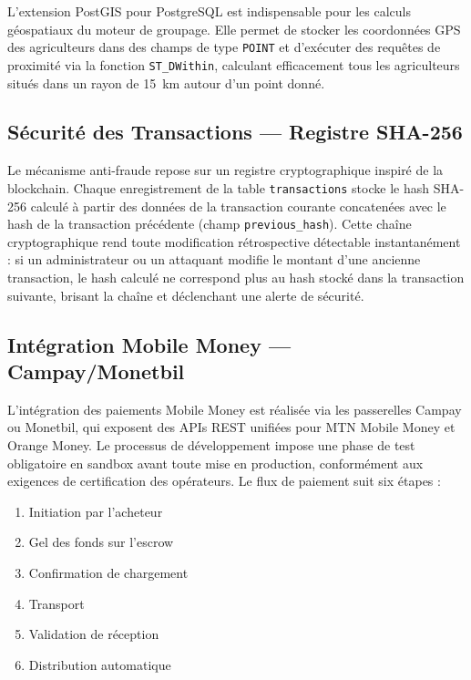 \documentclass[12pt,a4paper]{report}
\begin{document}
L'extension PostGIS pour PostgreSQL est indispensable pour les calculs géospatiaux du moteur de groupage. Elle permet de stocker les coordonnées GPS des agriculteurs dans des champs de type \texttt{POINT} et d'exécuter des requêtes de proximité via la fonction \texttt{ST\_DWithin}, calculant efficacement tous les agriculteurs situés dans un rayon de 15~km autour d'un point donné.

\subsection{Sécurité des Transactions — Registre SHA-256}

Le mécanisme anti-fraude repose sur un registre cryptographique inspiré de la blockchain. Chaque enregistrement de la table \texttt{transactions} stocke le hash SHA-256 calculé à partir des données de la transaction courante concatenées avec le hash de la transaction précédente (champ \texttt{previous\_hash}). Cette chaîne cryptographique rend toute modification rétrospective détectable instantanément : si un administrateur ou un attaquant modifie le montant d'une ancienne transaction, le hash calculé ne correspond plus au hash stocké dans la transaction suivante, brisant la chaîne et déclenchant une alerte de sécurité.

\subsection{Intégration Mobile Money — Campay/Monetbil}

L'intégration des paiements Mobile Money est réalisée via les passerelles Campay ou Monetbil, qui exposent des APIs REST unifiées pour MTN Mobile Money et Orange Money. Le processus de développement impose une phase de test obligatoire en sandbox avant toute mise en production, conformément aux exigences de certification des opérateurs. Le flux de paiement suit six étapes :

\begin{enumerate}
  \item Initiation par l'acheteur
  \item Gel des fonds sur l'escrow
  \item Confirmation de chargement
  \item Transport
  \item Validation de réception
  \item Distribution automatique
\end{enumerate}
\end{document}
